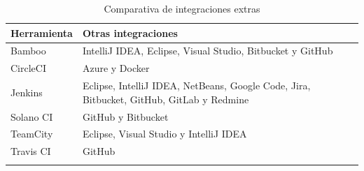 \begin{center}
\begin{longtable}{p{} p{}}
\hline \hline
  \textbf{Herramienta} & \textbf{Otras integraciones} \\
    \hline \hline
    Bamboo & IntelliJ IDEA, Eclipse, Visual Studio, Bitbucket y GitHub\\
    \hline\hline
    CircleCI & Azure y Docker\\
    \hline\hline
    Jenkins & Eclipse, IntelliJ IDEA, NetBeans, Google Code, Jira, Bitbucket, GitHub, GitLab y Redmine\\
    \hline\hline
      Solano CI & GitHub y Bitbucket\\
    \hline\hline
    TeamCity & Eclipse, Visual Studio y IntelliJ IDEA\\
    \hline\hline
    Travis CI & GitHub\\
    \hline\hline    
    
\caption{Comparativa de integraciones extras}
\end{longtable}
\end{center}